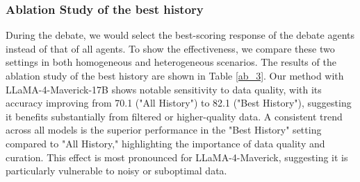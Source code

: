 \documentclass[letterpaper]{article} %
\begin{document}
\begin{table}[h]
\centering 
\caption{
Ablation study about reflection.
"homo" and "hete" mean homogeneous and heterogeneous, respectively.}
\label{ab_2}
 \vspace{-2mm}
\end{table}


\subsubsection{Ablation Study of the best history}

During the debate, we would select the best-scoring response of the debate agents instead of that of all agents. To show the effectiveness, we compare these two settings in both homogeneous and heterogeneous scenarios. The results of the ablation study of the best history are shown in Table \ref{ab_3}. Our method with LLaMA-4-Maverick-17B shows notable sensitivity to data quality, with its accuracy improving from 70.1 ("All History") to 82.1 ("Best History"), suggesting it benefits substantially from filtered or higher-quality data.  A consistent trend across all models is the superior performance in the "Best History" setting compared to "All History," highlighting the importance of data quality and curation. This effect is most pronounced for LLaMA-4-Maverick, suggesting it is particularly vulnerable to noisy or suboptimal data. 
\end{document}
